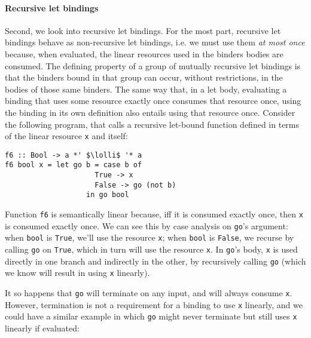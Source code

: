 \documentclass[acmsmall,review]{acmart}
\newcommand{\incode}[1]{\lstinline{#1}}
\newcommand{\lolli}{\multimap}
\begin{document}
\paragraph{Recursive let bindings\label{sec:semantic-linearity-examples:recursive-lets}}
Second, we look into recursive let bindings. For the most part,
recursive let bindings behave as non-recursive let bindings, i.e. we must use them \emph{at
most once} because, when evaluated, the linear resources used in the binders
bodies are consumed. The defining property of a group of mutually recursive let
bindings is that the binders bound in that group can occur, without restrictions, in
the bodies of those same binders. The same way that, in a let body, evaluating
a binding that uses some resource exactly once consumes that resource once,
using the binding in its own definition also entails using that resource once.
Consider the following program, that calls a recursive let-bound function
defined in terms of the linear resource \incode{x} and itself:
%
\begin{notyet}
\begin{lstlisting}
f6 :: Bool -> a *' $\lolli$ '* a
f6 bool x = let go b = case b of
                     True -> x
                     False -> go (not b)
                   in go bool
\end{lstlisting}
\end{notyet}
%
Function \incode{f6} is semantically linear because, iff it is consumed exactly once,
then \incode{x} is consumed exactly once. We can see this by case analysis on \incode{go}'s argument:
when \incode{bool} is \incode{True}, we'll use the resource \incode{x};
 when \incode{bool} is \incode{False}, we recurse by calling \incode{go} on \incode{True}, which in turn will use the resource \incode{x}.
In \incode{go}'s body, \incode{x} is used directly in one branch and indirectly in the
other, by recursively calling \incode{go} (which we know will result in using \incode{x}
linearly).
%

It so happens that \incode{go} will terminate on any input, and will always consume
\incode{x}. However, termination is not a requirement for a binding to use \incode{x} linearly,
and we could have a similar example in which \incode{go} might never terminate but still
uses \incode{x} linearly if evaluated:
\end{document}
